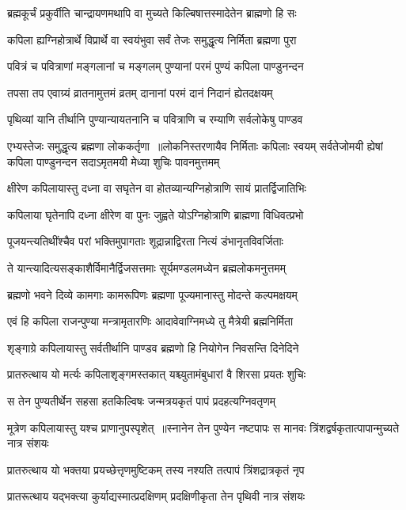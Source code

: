 \twolineshloka
{ब्रह्मकूर्चं प्रकुर्वीति चान्द्रायणमथापि वा}
{मुच्यते किल्बिषात्तस्मादेतेन ब्राह्मणो हि सः}


\twolineshloka
{कपिला ह्यग्निहोत्रार्थे विप्रार्थे वा स्वयंभुवा}
{सर्वं तेजः समुद्धृत्य निर्मिता ब्रह्मणा पुरा}


\twolineshloka
{पवित्रं च पवित्राणां मङ्गलानां च मङ्गलम्}
{पुण्यानां परमं पुण्यं कपिला पाण्डुनन्दन}


\twolineshloka
{तपसा तप एवाग्र्यं व्रातनामुत्तमं व्रतम्}
{दानानां परमं दानं निदानं ह्येतदक्षयम्}


\twolineshloka
{पृथिव्यां यानि तीर्थानि पुण्यान्यायतनानि च}
{पवित्राणि च रम्याणि सर्वलोकेषु पाण्डव}


एभ्यस्तेजः समुद्धृत्य ब्रह्मणा लोककर्तृणा ॥लोकनिस्तरणायैव निर्मिताः कपिलाः स्वयम्
\twolineshloka
{सर्वतेजोमयी ह्येषां कपिला पाण्डुनन्दन}
{सदाऽमृतमयी मेध्या शुचिः पावनमुत्तमम्}


\twolineshloka
{क्षीरेण कपिलायास्तु दध्ना वा सघृतेन वा}
{होतव्यान्यग्निहोत्राणि सायं प्रातर्द्विजातिभिः}


\twolineshloka
{कपिलाया घृतेनापि दध्ना क्षीरेण वा पुनः}
{जुह्वते योऽग्निहोत्राणि ब्राह्मणा विधिवत्प्रभो}


\twolineshloka
{पूजयन्त्यतिथींश्चैव परां भक्तिमुपागताः}
{शूद्रान्नाद्विरता नित्यं डंभानृतविवर्जिताः}


\twolineshloka
{ते यान्त्यादित्यसङ्काशैर्विमानैर्द्विजसत्तमाः}
{सूर्यमण्डलमध्येन ब्रह्मलोकमनुत्तमम्}


\twolineshloka
{ब्रह्मणो भवने दिव्ये कामगाः कामरूपिणः}
{ब्रह्मणा पूज्यमानास्तु मोदन्ते कल्पमक्षयम्}


\twolineshloka
{एवं हि कपिला राजन्पुण्या मन्त्रामृतारणिः}
{आदावेवाग्निमध्ये तु मैत्रेयी ब्रह्मनिर्मिता}


\twolineshloka
{शृङ्गाग्रे कपिलायास्तु सर्वतीर्थानि पाण्डव}
{ब्रह्मणो हि नियोगेन निवसन्ति दिनेदिने}


\twolineshloka
{प्रातरुत्थाय यो मर्त्यः कपिलाशृङ्गमस्तकात्}
{यश्च्युतामंबुधारां वै शिरसा प्रयतः शुचिः}


\twolineshloka
{स तेन पुण्यतीर्थेन सहसा हतकिल्विषः}
{जन्मत्रयकृतं पापं प्रदहत्यग्निवतृणम्}


\twolineshloka
{मूत्रेण कपिलायास्तु यश्च प्राणानुपस्पृशेत् ॥स्नानेन तेन पुण्येन नष्टपापः स मानवः}
{त्रिंशद्वर्षकृतात्पापान्मुच्यते नात्र संशयः}


\twolineshloka
{प्रातरुत्थाय यो भक्तया प्रयच्छेत्तृणमुष्टिकम्}
{तस्य नश्यति तत्पापं त्रिंशद्रात्रकृतं नृप}


\twolineshloka
{प्रातरूत्थाय यद्भक्त्या कुर्याद्यस्मात्प्रदक्षिणम्}
{प्रदक्षिणीकृता तेन पृथिवी नात्र संशयः}


